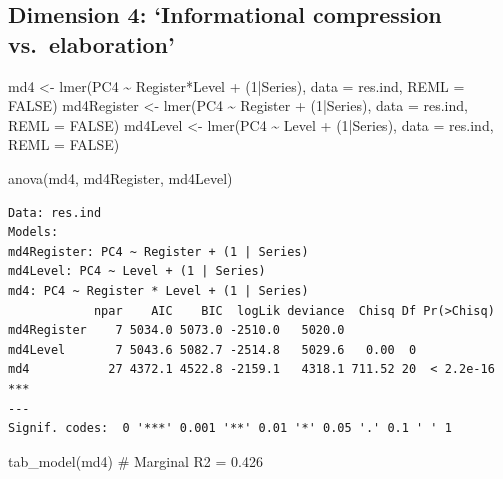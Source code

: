 \documentclass[
  letterpaper,
  DIV=11,
  numbers=noendperiod]{scrreprt}
\newenvironment{Shaded}{\begin{snugshade}}{\end{snugshade}}
\newcommand{\AttributeTok}[1]{\textcolor[rgb]{0.40,0.45,0.13}{#1}}
\newcommand{\CommentTok}[1]{\textcolor[rgb]{0.37,0.37,0.37}{#1}}
\newcommand{\ConstantTok}[1]{\textcolor[rgb]{0.56,0.35,0.01}{#1}}
\newcommand{\DecValTok}[1]{\textcolor[rgb]{0.68,0.00,0.00}{#1}}
\newcommand{\FunctionTok}[1]{\textcolor[rgb]{0.28,0.35,0.67}{#1}}
\newcommand{\NormalTok}[1]{\textcolor[rgb]{0.00,0.23,0.31}{#1}}
\newcommand{\OtherTok}[1]{\textcolor[rgb]{0.00,0.23,0.31}{#1}}
\newcommand{\SpecialCharTok}[1]{\textcolor[rgb]{0.37,0.37,0.37}{#1}}
\begin{document}
\subsection{Dimension 4: `Informational compression
vs.~elaboration'}\label{dimension-4-informational-compression-vs.-elaboration}

\begin{Shaded}
\begin{Highlighting}[]
\NormalTok{md4 }\OtherTok{\textless{}{-}} \FunctionTok{lmer}\NormalTok{(PC4 }\SpecialCharTok{\textasciitilde{}}\NormalTok{ Register}\SpecialCharTok{*}\NormalTok{Level }\SpecialCharTok{+}\NormalTok{ (}\DecValTok{1}\SpecialCharTok{|}\NormalTok{Series), }\AttributeTok{data =}\NormalTok{ res.ind, }\AttributeTok{REML =} \ConstantTok{FALSE}\NormalTok{)}
\NormalTok{md4Register }\OtherTok{\textless{}{-}} \FunctionTok{lmer}\NormalTok{(PC4 }\SpecialCharTok{\textasciitilde{}}\NormalTok{ Register }\SpecialCharTok{+}\NormalTok{ (}\DecValTok{1}\SpecialCharTok{|}\NormalTok{Series), }\AttributeTok{data =}\NormalTok{ res.ind, }\AttributeTok{REML =} \ConstantTok{FALSE}\NormalTok{)}
\NormalTok{md4Level }\OtherTok{\textless{}{-}} \FunctionTok{lmer}\NormalTok{(PC4 }\SpecialCharTok{\textasciitilde{}}\NormalTok{ Level }\SpecialCharTok{+}\NormalTok{ (}\DecValTok{1}\SpecialCharTok{|}\NormalTok{Series), }\AttributeTok{data =}\NormalTok{ res.ind, }\AttributeTok{REML =} \ConstantTok{FALSE}\NormalTok{)}

\FunctionTok{anova}\NormalTok{(md4, md4Register, md4Level)}
\end{Highlighting}
\end{Shaded}

\begin{verbatim}
Data: res.ind
Models:
md4Register: PC4 ~ Register + (1 | Series)
md4Level: PC4 ~ Level + (1 | Series)
md4: PC4 ~ Register * Level + (1 | Series)
            npar    AIC    BIC  logLik deviance  Chisq Df Pr(>Chisq)    
md4Register    7 5034.0 5073.0 -2510.0   5020.0                         
md4Level       7 5043.6 5082.7 -2514.8   5029.6   0.00  0               
md4           27 4372.1 4522.8 -2159.1   4318.1 711.52 20  < 2.2e-16 ***
---
Signif. codes:  0 '***' 0.001 '**' 0.01 '*' 0.05 '.' 0.1 ' ' 1
\end{verbatim}

\begin{Shaded}
\begin{Highlighting}[]
\FunctionTok{tab\_model}\NormalTok{(md4) }\CommentTok{\# Marginal R2 = 0.426}
\end{Highlighting}
\end{Shaded}
\end{document}
